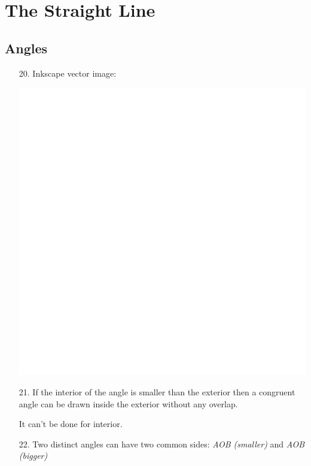\chapter{The Straight Line}

\section{Angles}
\begin{enumerate}
	\item[20.] Inkscape vector image:
	
	\includegraphics[scale=0.6]{chapters/ch01/images/20}
	
	\item[21.] If the interior of the angle is smaller than the exterior then a congruent angle can be drawn inside the exterior without any overlap.
	
	It can't be done for interior.
	
	\item[22.] Two distinct angles can have two common sides: \textit{AOB (smaller)} and \textit{AOB (bigger)}
	

\end{enumerate}
